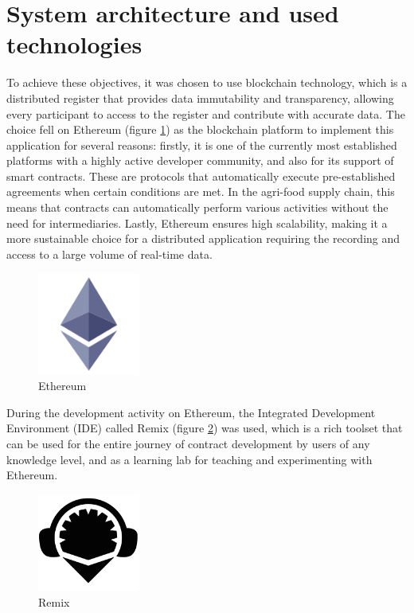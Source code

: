 \section{System architecture and used technologies}
To achieve these objectives, it was chosen to use blockchain technology, which is a distributed register that provides data immutability and transparency, allowing every participant to access to the register and contribute with accurate data. The choice fell on Ethereum (figure \ref{Ethereum}) as the blockchain platform to implement this application for several reasons: firstly, it is one of the currently most established platforms with a highly active developer community, and also for its support of smart contracts. These are protocols that automatically execute pre-established agreements when certain conditions are met. In the agri-food supply chain, this means that contracts can automatically perform various activities without the need for intermediaries. Lastly, Ethereum ensures high scalability, making it a more sustainable choice for a distributed application requiring the recording and access to a large volume of real-time data.

\begin{figure}[ht]
    \centering
    \captionsetup[]{width=\textwidth}
    \includegraphics[width=0.3\textwidth, height=0.3\textwidth, scale=1]{img/Ethereum-icon.png}
    \caption{Ethereum}
    \label{Ethereum}
\end{figure}

During the development activity on Ethereum, the Integrated Development Environment (IDE) called Remix (figure \ref{Remix}) was used, which is a rich toolset that can be used for the entire journey of contract development by users of any knowledge level, and as a learning lab for teaching and experimenting with Ethereum.

\begin{figure}[ht]
    \centering
    \captionsetup[]{width=\textwidth}
    \includegraphics[width=0.3\textwidth, height=0.3\textwidth, scale=1]{img/Remix.png}
    \caption{Remix}
    \label{Remix}
\end{figure}

